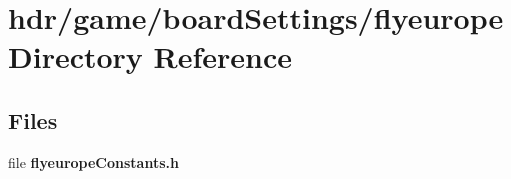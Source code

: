\section{hdr/game/board\-Settings/flyeurope Directory Reference}
\label{dir_02f9b957e1dd28adae1714b67d143859}
\subsection*{Files}
\begin{DoxyCompactItemize}
\item 
file {\bfseries flyeurope\-Constants.\-h}
\end{DoxyCompactItemize}
